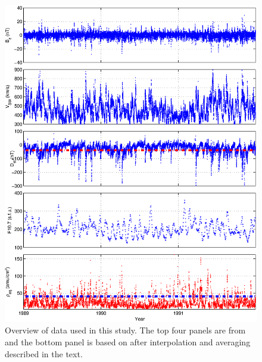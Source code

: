 \documentclass[10pt,twocolumn]{article}
\begin{document}
\begin{figure}[htp]
\centering
\includegraphics[scale=0.7]{paperfigures/alldata.eps}
\caption{Overview of data used in this study. The top four panels are from \cite{Reconstruction} and the bottom panel is based on \cite{Denton} after interpolation and averaging described in the text.}
\label{AllData}
\end{figure}
\clearpage
\end{document}
